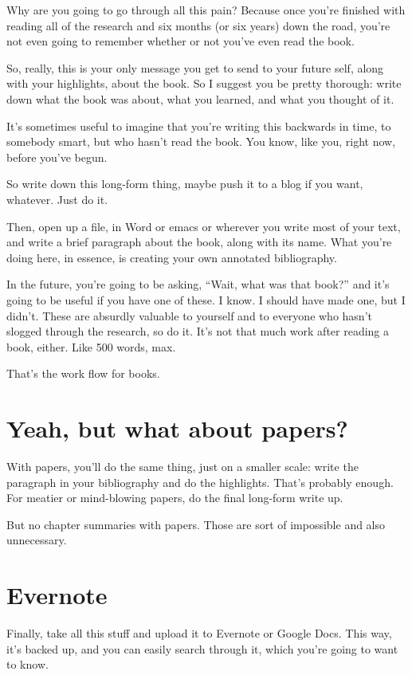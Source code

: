 Why are you going to go through all this pain? Because once you're finished
with reading all of the research and six months (or six years) down the road,
you're not even going to remember whether or not you've even read the book.

So, really, this is your only message you get to send to your future self, along
with your highlights, about the book. So I suggest you be pretty
thorough: write down what the book was about, what you learned, and what you
thought of it.

It's sometimes useful to imagine that you're writing this backwards in time, to
somebody smart, but who hasn't read the book. You know, like you, right now,
before you've begun.

So write down this long-form thing, maybe push it to a blog if you want,
whatever. Just do it.

Then, open up a file, in Word or emacs or wherever you write most of your text,
and write a brief paragraph about the book, along with its name. What you're
doing here, in essence, is creating your own annotated bibliography.

In the future, you're going to be asking, ``Wait, what was that book?'' and it's
going to be useful if you have one of these. I know. I should have made one, but
I didn't. These are absurdly valuable to yourself and to everyone who hasn't
slogged through the research, so do it. It's not that much work after reading a
book, either. Like 500 words, max.

That's the work flow for books.

\section{Yeah, but what about papers?}

With papers, you'll do the same thing, just on a smaller scale: write the
paragraph in your bibliography and do the highlights. That's probably
enough. For meatier or mind-blowing papers, do the final long-form write up.

But no chapter summaries with papers. Those are sort of impossible and also
unnecessary.

\section{Evernote}

Finally, take all this stuff and upload it to Evernote or Google Docs. This way,
it's backed up, and you can easily search through it, which you're going to want
to know.


